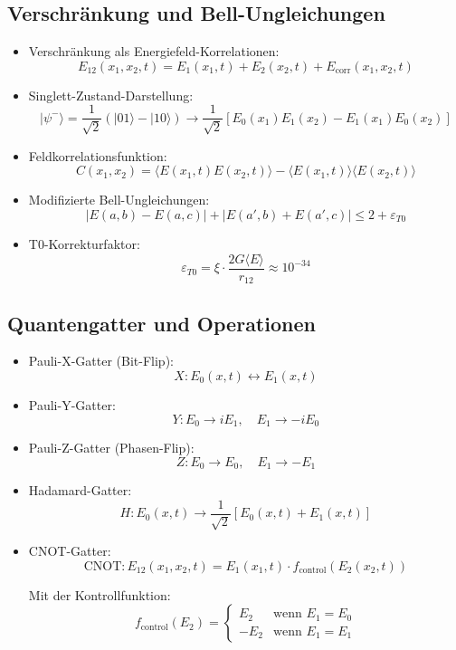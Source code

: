 \documentclass[12pt,a4paper]{article}
\begin{document}
	\subsection{Verschr\"{a}nkung und Bell-Ungleichungen}
	\begin{itemize}
		\item Verschr\"{a}nkung als Energiefeld-Korrelationen:
		$$E_{12}(x_1,x_2,t) = E_1(x_1,t) + E_2(x_2,t) + E_{\text{corr}}(x_1,x_2,t)$$
		
		\item Singlett-Zustand-Darstellung:
		$$|\psi^-\rangle = \frac{1}{\sqrt{2}}(|01\rangle - |10\rangle) \rightarrow \frac{1}{\sqrt{2}}[E_0(x_1)E_1(x_2) - E_1(x_1)E_0(x_2)]$$
		
		\item Feldkorrelationsfunktion:
		$$C(x_1,x_2) = \langle E(x_1,t) E(x_2,t) \rangle - \langle E(x_1,t) \rangle \langle E(x_2,t) \rangle$$
		
		\item Modifizierte Bell-Ungleichungen:
		$$|E(a,b) - E(a,c)| + |E(a',b) + E(a',c)| \leq 2 + \varepsilon_{T0}$$
		
		\item T0-Korrekturfaktor:
		$$\varepsilon_{T0} = \xi \cdot \frac{2G\langle E \rangle}{r_{12}} \approx 10^{-34}$$
	\end{itemize}
	
	\subsection{Quantengatter und Operationen}
	\begin{itemize}
		\item Pauli-X-Gatter (Bit-Flip):
		$$X: E_0(x,t) \leftrightarrow E_1(x,t)$$
		
		\item Pauli-Y-Gatter:
		$$Y: E_0 \rightarrow iE_1, \quad E_1 \rightarrow -iE_0$$
		
		\item Pauli-Z-Gatter (Phasen-Flip):
		$$Z: E_0 \rightarrow E_0, \quad E_1 \rightarrow -E_1$$
		
		\item Hadamard-Gatter:
		$$H: E_0(x,t) \rightarrow \frac{1}{\sqrt{2}}[E_0(x,t) + E_1(x,t)]$$
		
		\item CNOT-Gatter:
		$$\text{CNOT}: E_{12}(x_1,x_2,t) = E_1(x_1,t) \cdot f_{\text{control}}(E_2(x_2,t))$$
		
		Mit der Kontrollfunktion:
		$$f_{\text{control}}(E_2) = \begin{cases}
			E_2 & \text{wenn } E_1 = E_0 \\
			-E_2 & \text{wenn } E_1 = E_1
		\end{cases}$$
	\end{itemize}
	
\end{document}
